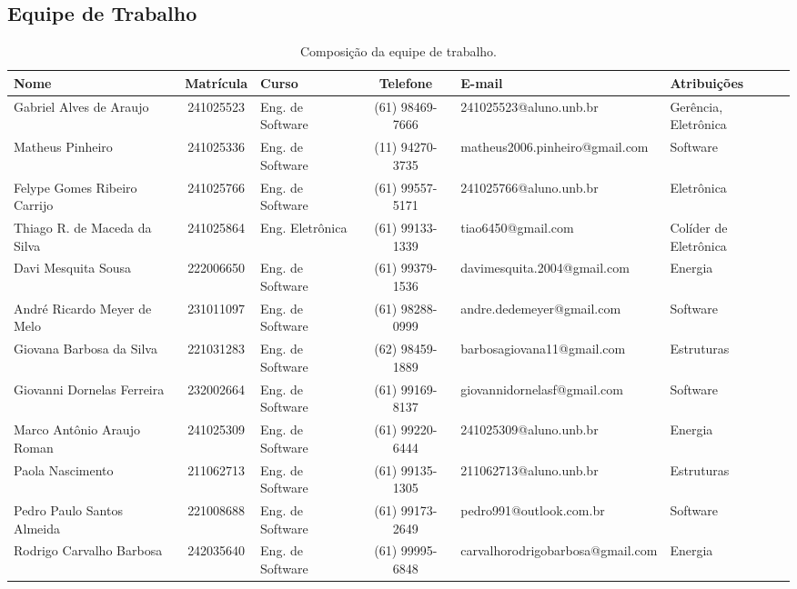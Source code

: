 \begin{landscape}

\chapter{Equipe de Trabalho}

\begin{table}[htpb]
\centering
\small %
\caption{Composição da equipe de trabalho.}
\label{tab:equipe_trabalho}
\begin{tabular}{|l|c|l|c|l|l|}
\hline
\textbf{Nome} & \textbf{Matrícula} & \textbf{Curso} & \textbf{Telefone} & \textbf{E-mail} & \textbf{Atribuições}\\ \hline
Gabriel Alves de Araujo & 241025523 & Eng. de Software & (61) 98469-7666 & 241025523@aluno.unb.br & Gerência, Eletrônica \\ \hline
Matheus Pinheiro & 241025336 & Eng. de Software & (11) 94270-3735 & matheus2006.pinheiro@gmail.com & Software \\ \hline
Felype Gomes Ribeiro Carrijo & 241025766 & Eng. de Software & (61) 99557-5171 & 241025766@aluno.unb.br & Eletrônica \\ \hline
Thiago R. de Maceda da Silva & 241025864 & Eng. Eletrônica & (61) 99133-1339 & tiao6450@gmail.com & Colíder de Eletrônica \\ \hline
Davi Mesquita Sousa & 222006650 & Eng. de Software & (61) 99379-1536 & davimesquita.2004@gmail.com & Energia \\ \hline
André Ricardo Meyer de Melo & 231011097 & Eng. de Software & (61) 98288-0999 & andre.dedemeyer@gmail.com & Software \\ \hline
Giovana Barbosa da Silva & 221031283 & Eng. de Software & (62) 98459-1889 & barbosagiovana11@gmail.com & Estruturas \\ \hline
Giovanni Dornelas Ferreira & 232002664 & Eng. de Software & (61) 99169-8137 & giovannidornelasf@gmail.com & Software \\ \hline
Marco Antônio Araujo Roman & 241025309 & Eng. de Software & (61) 99220-6444 & 241025309@aluno.unb.br & Energia \\ \hline
Paola Nascimento & 211062713 & Eng. de Software & (61) 99135-1305 & 211062713@aluno.unb.br & Estruturas \\ \hline
Pedro Paulo Santos Almeida & 221008688 & Eng. de Software & (61) 99173-2649 & pedro991@outlook.com.br & Software \\ \hline
Rodrigo Carvalho Barbosa & 242035640 & Eng. de Software & (61) 99995-6848 & carvalhorodrigobarbosa@gmail.com & Energia \\ \hline

\end{tabular}
\end{table}
\end{landscape}
